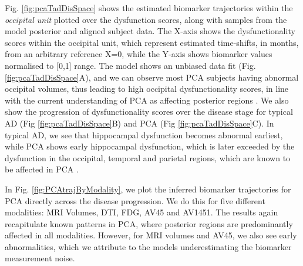 \documentclass{llncs}
\begin{document}
Fig. \ref{fig:pcaTadDisSpace} shows the estimated biomarker trajectories within the \emph{occipital unit} plotted over the dysfunction scores, along with samples from the model posterior and aligned subject data. The X-axis shows the dysfunctionality scores within the occipital unit, which represent estimated time-shifts, in months, from an arbitrary reference X=0, while the Y-axis shows biomarker values normalised to [0,1] range. The model shows an unbiased data fit (Fig. \ref{fig:pcaTadDisSpace}A), and we can observe most PCA subjects having abnormal occipital volumes, thus leading to high occipital dysfunctionality scores, in line with the current understanding of PCA as affecting posterior regions \cite{crutch2012posterior}. We also show the progression of dysfunctionality scores over the disease stage for typical AD (Fig \ref{fig:pcaTadDisSpace}B) and PCA (Fig \ref{fig:pcaTadDisSpace}C). In typical AD, we see that hippocampal dysfunction becomes abnormal earliest, while PCA shows early hippocampal dysfunction, which is later exceeded by the dysfunction in the occipital, temporal and parietal regions, which are known to be affected in PCA \cite{crutch2012posterior,Baron2001}. 

In Fig. \ref{fig:PCAtrajByModality}, we plot the inferred biomarker trajectories for PCA directly across the disease progression. We do this for five different modalities: MRI Volumes, DTI, FDG, AV45 and AV1451. The results again recapitulate known patterns in PCA, where posterior regions are predominantly affected in all modalities. However, for MRI volumes and AV45, we also see early abnormalities, which we attribute to the models underestimating the biomarker measurement noise.
\end{document}
